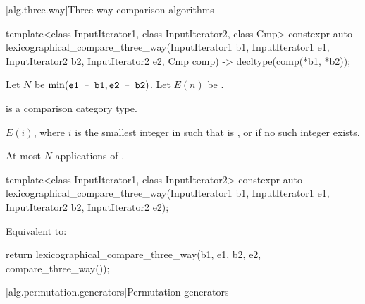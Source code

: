 [alg.three.way]{Three-way comparison algorithms}

%
\begin{itemdecl}
template<class InputIterator1, class InputIterator2, class Cmp>
  constexpr auto
    lexicographical_compare_three_way(InputIterator1 b1, InputIterator1 e1,
                                      InputIterator2 b2, InputIterator2 e2,
                                      Cmp comp)
      -> decltype(comp(*b1, *b2));
\end{itemdecl}

\begin{itemdescr}
\pnum
Let $N$ be $\min(\tcode{e1 - b1}, \tcode{e2 - b2})$.
Let $E(n)$ be .

\pnum
\mandates
{} is a comparison category type.

\pnum
\returns
$E(i)$, where $i$ is the smallest integer in 
such that  is , or
 if no such integer exists.

\pnum
\complexity
At most $N$ applications of .
\end{itemdescr}

%
\begin{itemdecl}
template<class InputIterator1, class InputIterator2>
  constexpr auto
    lexicographical_compare_three_way(InputIterator1 b1, InputIterator1 e1,
                                      InputIterator2 b2, InputIterator2 e2);
\end{itemdecl}

\begin{itemdescr}
\pnum
\effects
Equivalent to:
\begin{codeblock}
return lexicographical_compare_three_way(b1, e1, b2, e2, compare_three_way());
\end{codeblock}
\end{itemdescr}

[alg.permutation.generators]{Permutation generators}

